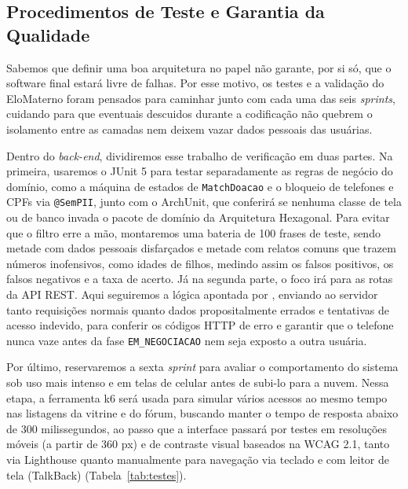\subsection{Procedimentos de Teste e Garantia da Qualidade}
Sabemos que definir uma boa arquitetura no papel não garante, por si só, que o software final estará livre de falhas. Por esse motivo, os testes e a validação do EloMaterno foram pensados para caminhar junto com cada uma das seis \textit{sprints}, cuidando para que eventuais descuidos durante a codificação não quebrem o isolamento entre as camadas nem deixem vazar dados pessoais das usuárias.

Dentro do \textit{back-end}, dividiremos esse trabalho de verificação em duas partes. Na primeira, usaremos o JUnit 5 para testar separadamente as regras de negócio do domínio, como a máquina de estados de \texttt{MatchDoacao} e o bloqueio de telefones e CPFs via \texttt{@SemPII}, junto com o ArchUnit, que conferirá se nenhuma classe de tela ou de banco invada o pacote de domínio da Arquitetura Hexagonal. Para evitar que o filtro erre a mão, montaremos uma bateria de 100 frases de teste, sendo metade com dados pessoais disfarçados e metade com relatos comuns que trazem números inofensivos, como idades de filhos, medindo assim os falsos positivos, os falsos negativos e a taxa de acerto. Já na segunda parte, o foco irá para as rotas da API REST. Aqui seguiremos a lógica apontada por \textcite{banias2021}, enviando ao servidor tanto requisições normais quanto dados propositalmente errados e tentativas de acesso indevido, para conferir os códigos HTTP de erro e garantir que o telefone nunca vaze antes da fase \texttt{EM\_NEGOCIACAO} nem seja exposto a outra usuária.

Por último, reservaremos a sexta \textit{sprint} para avaliar o comportamento do sistema sob uso mais intenso e em telas de celular antes de subi-lo para a nuvem. Nessa etapa, a ferramenta k6 será usada para simular vários acessos ao mesmo tempo nas listagens da vitrine e do fórum, buscando manter o tempo de resposta abaixo de 300 milissegundos, ao passo que a interface passará por testes em resoluções móveis (a partir de 360 px) e de contraste visual baseados na WCAG 2.1, tanto via Lighthouse quanto manualmente para navegação via teclado e com leitor de tela (TalkBack) (Tabela~\ref{tab:testes}).

